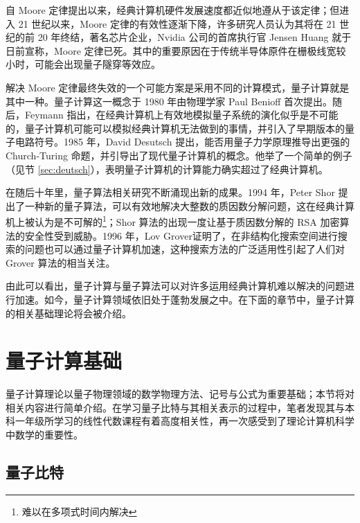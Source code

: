 \documentclass[a4paper,11pt,onecolumn,twoside]{article}
\begin{document}
自 Moore 定律提出以来，经典计算机硬件发展速度都近似地遵从于该定律；但进入 21 世纪以来，Moore 定律的有效性逐渐下降，许多研究人员认为其将在 21 世纪的前 20 年终结，著名芯片企业，Nvidia 公司的首席执行官 Jensen Huang 就于日前宣称，Moore 定律已死\cite{moorelawdead}。其中的重要原因在于传统半导体原件在栅极线宽较小时，可能会出现量子隧穿等效应\cite{kumar2015fundamental}。

解决 Moore 定律最终失效的一个可能方案是采用不同的计算模式，量子计算就是其中一种。量子计算这一概念于 1980 年由物理学家 Paul Benioff 首次提出\cite{benioff1980computer}。随后，Feymann 指出，在经典计算机上有效地模拟量子系统的演化似乎是不可能的，量子计算机可能可以模拟经典计算机无法做到的事情\cite{feynman1981simulating}，并引入了早期版本的量子电路符号\cite{feynman1986quantum}。1985 年，David Desutsch 提出，能否用量子力学原理推导出更强的 Church-Turing 命题，并引导出了现代量子计算机的概念\cite{deutsch1985quantum}。他举了一个简单的例子（见节 \ref{sec:deutsch}），表明量子计算机的计算能力确实超过了经典计算机。

在随后十年里，量子算法相关研究不断涌现出新的成果。1994 年，Peter Shor 提出了一种新的量子算法，可以有效地解决大整数的质因数分解问题\cite{shor1994algorithms}，这在经典计算机上被认为是不可解的\footnote{难以在多项式时间内解决}；Shor 算法的出现一度让基于质因数分解的 RSA 加密算法的安全性受到威胁\cite{mermin2006breaking}。1996 年，Lov Grover证明了，在非结构化搜索空间进行搜索的问题也可以通过量子计算机加速\cite{grover1996fast}，这种搜索方法的广泛适用性引起了人们对 Grover 算法的相当关注。

由此可以看出，量子计算与量子算法可以对许多运用经典计算机难以解决的问题进行加速。如今，量子计算领域依旧处于蓬勃发展之中。在下面的章节中，量子计算的相关基础理论将会被介绍。

\section{量子计算基础}

量子计算理论以量子物理领域的数学物理方法、记号与公式为重要基础；本节将对相关内容进行简单介绍。在学习量子比特与其相关表示的过程中，笔者发现其与本科一年级所学习的线性代数课程有着高度相关性，再一次感受到了理论计算机科学中数学的重要性。

\subsection{量子比特}
\end{document}
